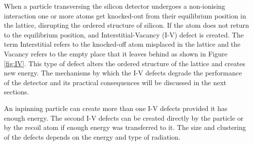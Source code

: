 When a particle transversing the silicon detector undergoes a non-ionising interaction one or more atoms get knocked-out from their equilibrium position in the lattice, disrupting the ordered structure of silicon. If the atom does not return to the equilibrium position, and Interstitial-Vacancy (I-V) defect is created. The term Interstitial refers to the knocked-off atom misplaced in the lattice and the Vacancy refers to the empty place that it leaves behind as shown in Figure \ref{fig:IV}. This type of defect alters the ordered structure of the lattice and creates new energy. The mechanisms by which the I-V defects degrade the performance of the detector and its practical consequences will be discussed in the next sections.


An inpinning particle can create more than one I-V defects provided it has enough energy. The second I-V defects can be created directly by the particle or by the recoil atom if enough energy was transferred to it. The size and clustering of the defects depends on the energy and type of radiation. 


